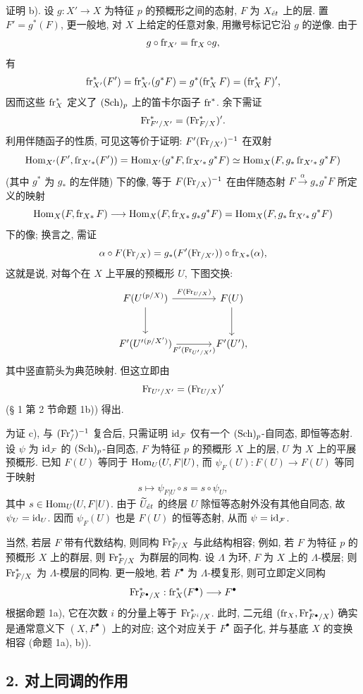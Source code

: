 证明 b). 设 $g:X'\to X$ 为特征 $p$ 的预概形之间的态射, $F$ 为 $X_{\acute{e}t}$ 上的层. 置 $F'=g^*(F)$, 更一般地, 对 $X$ 上给定的任意对象, 用撇号标记它沿 $g$ 的逆像. 由于
\[
g\circ\operatorname{fr}_{X'}=\operatorname{fr}_X\circ g,
\]
有
\[
\operatorname{fr}_{X'}^*(F')=\operatorname{fr}_{X'}^*(g^*F)=g^*(\operatorname{fr}_X^*F)=(\operatorname{fr}_X^*F)',
\]
因而这些 $\operatorname{fr}_X^*$ 定义了 $(\operatorname{Sch})_p$ 上的笛卡尔函子 $\operatorname{fr}^*$. 余下需证
\[
\operatorname{Fr}^*_{F'/X'}=(\operatorname{Fr}^*_{F/X})'.
\]
利用伴随函子的性质, 可见这等价于证明: $F'(\operatorname{Fr}_{/X'})^{-1}$ 在双射
\[
\operatorname{Hom}_{X'}(F',\operatorname{fr}_{X'*}(F'))
 =\operatorname{Hom}_{X'}(g^*F,\operatorname{fr}_{X'*}g^*F)
 \simeq \operatorname{Hom}_X(F,g_*\operatorname{fr}_{X'*}g^*F)
\]
(其中 $g^*$ 为 $g_*$ 的左伴随) 下的像, 等于 $F(\operatorname{Fr}_{/X})^{-1}$ 在由伴随态射 $F\xrightarrow{\alpha}g_*g^*F$ 所定义的映射
\[
\operatorname{Hom}_X(F,\operatorname{fr}_{X*}F)\longrightarrow
\operatorname{Hom}_X(F,\operatorname{fr}_{X*}g_*g^*F)=
\operatorname{Hom}_X(F,g_*\operatorname{fr}_{X'*}g^*F)
\]
下的像; 换言之, 需证
\[
\alpha\circ F(\operatorname{Fr}_{/X})=g_*(F'(\operatorname{Fr}_{/X'}))\circ\operatorname{fr}_{X*}(\alpha),
\]
这就是说, 对每个在 $X$ 上平展的预概形 $U$, 下图交换:
\[
\begin{tikzcd}[column sep=large,row sep=large]
F(U^{(p/X)}) \arrow[r,"F(\Fr_{U/X})"] \arrow[d]
& F(U) \arrow[d]\\
F'(U'{}^{(p/X')}) \arrow[r,"F'(\Fr_{U'/X'})"']
& F'(U') ,
\end{tikzcd}
\]
其中竖直箭头为典范映射. 但这立即由
\[
\operatorname{Fr}_{U'/X'}=(\operatorname{Fr}_{U/X})'
\]
(§ 1 第 2 节命题 1b)) 得出.

为证 c), 与 $(\operatorname{Fr}^*_{/})^{-1}$ 复合后, 只需证明 $\operatorname{id}_{\mathcal F}$ 仅有一个 $(\operatorname{Sch})_p$-自同态, 即恒等态射. 设 $\psi$ 为 $\operatorname{id}_{\mathcal F}$ 的 $(\operatorname{Sch})_p$-自同态, $F$ 为特征 $p$ 的预概形 $X$ 上的层, $U$ 为 $X$ 上的平展预概形. 已知 $F(U)$ 等同于 $\operatorname{Hom}_U(U,F|U)$, 而 $\psi_F(U):F(U)\to F(U)$ 等同于映射
\[
s\longmapsto \psi_{F|U}\circ s=s\circ\psi_U,
\]
其中 $s\in\operatorname{Hom}_U(U,F|U)$. 由于 $\widetilde U_{\acute{e}t}$ 的终层 $U$ 除恒等态射外没有其他自同态, 故 $\psi_U=\operatorname{id}_U$. 因而 $\psi_F(U)$ 也是 $F(U)$ 的恒等态射, 从而 $\psi=\operatorname{id}_{\mathcal F}$.

当然, 若层 $F$ 带有代数结构, 则同构 $\operatorname{Fr}^*_{F/X}$ 与此结构相容; 例如, 若 $F$ 为特征 $p$ 的预概形 $X$ 上的群层, 则 $\operatorname{Fr}^*_{F/X}$ 为群层的同构. 设 $\Lambda$ 为环, $F$ 为 $X$ 上的 $\Lambda$-模层; 则 $\operatorname{Fr}^*_{F/X}$ 为 $\Lambda$-模层的同构. 更一般地, 若 $F^\bullet$ 为 $\Lambda$-模复形, 则可立即定义同构
\[
\operatorname{Fr}^*_{F^\bullet/X}:\operatorname{fr}_X^*(F^\bullet)\longrightarrow F^\bullet
\]
根据命题 1a), 它在次数 $i$ 的分量上等于 $\operatorname{Fr}^*_{F^i/X}$. 此时, 二元组 $(\operatorname{fr}_X,\operatorname{Fr}^*_{F^\bullet/X})$ 确实是通常意义下 $(X,F^\bullet)$ 上的对应; 这个对应关于 $F^\bullet$ 函子化, 并与基底 $X$ 的变换相容 (命题 1a), b)).

\subsection*{2. 对上同调的作用}

